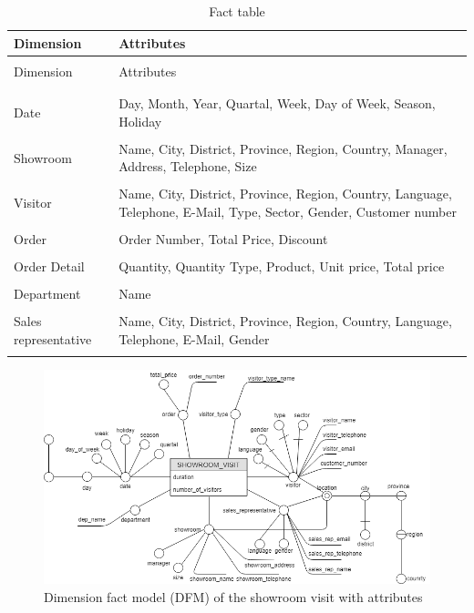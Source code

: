 \documentclass[letterpaper,12pt]{article}
\begin{document}
\begingroup
\renewcommand\arraystretch{0.5}
\begin{longtable}{p{3.7cm}p{10cm}}
        \caption{Fact table} \\
        Dimension & Attributes \\
        \endfirsthead \\
        Dimension & Attributes \\
        \endhead \\
        \hline \\
        Date & Day, Month, Year, Quartal, Week, Day of Week, Season, Holiday \\
        \hline \\
        Showroom & Name, City, District, Province, Region, Country, Manager, Address, Telephone, Size \\
        \hline \\
        Visitor & Name, City, District, Province, Region, Country, Language, Telephone, E-Mail, Type, Sector, Gender, Customer number \\
        \hline \\
        Order & Order Number, Total Price, Discount \\
        \hline \\
        Order Detail & Quantity, Quantity Type, Product, Unit price, Total price \\
        \hline \\
        Department & Name \\
        \hline \\
        Sales representative & Name, City, District, Province, Region, Country, Language, Telephone, E-Mail, Gender \\
        \hline \\
\end{longtable}
\endgroup

\begin{figure}[H] 
        \centering
        \includegraphics[width=\columnwidth]{../images/DFM_Showroom.png}
        \caption{
                \label{fig:showroomAttributes}  
                Dimension fact model (DFM) of the showroom visit with attributes 
        }
\end{figure}
\end{document}
